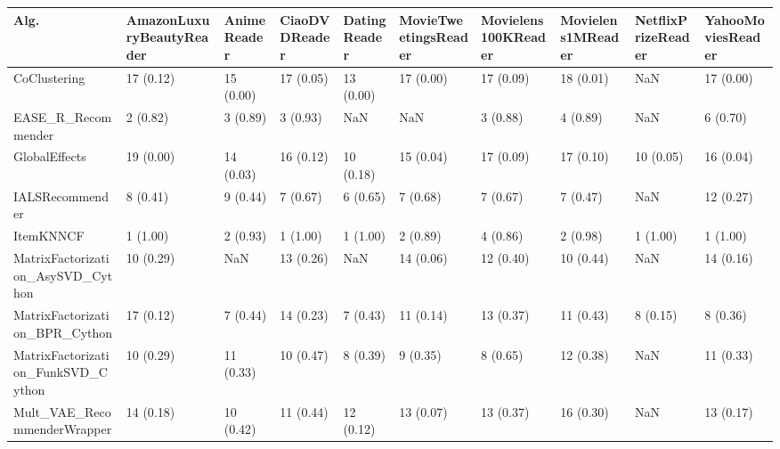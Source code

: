 \begin{tabular}{llllllllll}
\toprule
                               Alg. & AmazonLuxuryBeautyReader & AnimeReader & CiaoDVDReader & DatingReader & MovieTweetingsReader & Movielens100KReader & Movielens1MReader & NetflixPrizeReader & YahooMoviesReader \\
\midrule
                       CoClustering &                17 (0.12) &   15 (0.00) &     17 (0.05) &    13 (0.00) &            17 (0.00) &           17 (0.09) &         18 (0.01) &                NaN &         17 (0.00) \\
                 EASE\_R\_Recommender &                 2 (0.82) &    3 (0.89) &      3 (0.93) &          NaN &                  NaN &            3 (0.88) &          4 (0.89) &                NaN &          6 (0.70) \\
                      GlobalEffects &                19 (0.00) &   14 (0.03) &     16 (0.12) &    10 (0.18) &            15 (0.04) &           17 (0.09) &         17 (0.10) &          10 (0.05) &         16 (0.04) \\
                    IALSRecommender &                 8 (0.41) &    9 (0.44) &      7 (0.67) &     6 (0.65) &             7 (0.68) &            7 (0.67) &          7 (0.47) &                NaN &         12 (0.27) \\
                          ItemKNNCF &                 1 (1.00) &    2 (0.93) &      1 (1.00) &     1 (1.00) &             2 (0.89) &            4 (0.86) &          2 (0.98) &           1 (1.00) &          1 (1.00) \\
  MatrixFactorization\_AsySVD\_Cython &                10 (0.29) &         NaN &     13 (0.26) &          NaN &            14 (0.06) &           12 (0.40) &         10 (0.44) &                NaN &         14 (0.16) \\
     MatrixFactorization\_BPR\_Cython &                17 (0.12) &    7 (0.44) &     14 (0.23) &     7 (0.43) &            11 (0.14) &           13 (0.37) &         11 (0.43) &           8 (0.15) &          8 (0.36) \\
 MatrixFactorization\_FunkSVD\_Cython &                10 (0.29) &   11 (0.33) &     10 (0.47) &     8 (0.39) &             9 (0.35) &            8 (0.65) &         12 (0.38) &                NaN &         11 (0.33) \\
        Mult\_VAE\_RecommenderWrapper &                14 (0.18) &   10 (0.42) &     11 (0.44) &    12 (0.12) &            13 (0.07) &           13 (0.37) &         16 (0.30) &                NaN &         13 (0.17) \\

\end{tabular}

